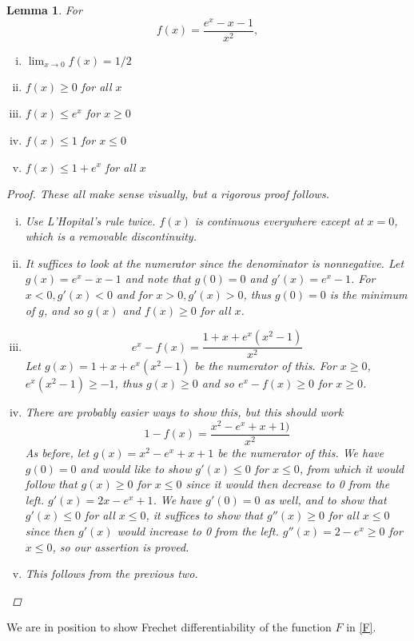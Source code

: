 \documentclass[12pt]{article}
\newtheorem{lemma}{Lemma}
\begin{document}
\begin{lemma}\label{expineq}
For
\[
f(x) = \frac{e^x - x - 1}{x^2},
\]

\begin{enumerate}[(i)]
	\item $\lim_{x \rightarrow 0} f(x) = 1/2$
	\item $f(x) \geq 0$ for all $x$
	\item $f(x) \leq e^x$ for $x \geq 0$
	\item $f(x) \leq 1$ for $x \leq 0$
	\item $f(x) \leq 1 + e^x$ for all $x$
\end{enumerate}
\begin{proof}
These all make sense visually, but a rigorous proof follows.
\begin{enumerate}[(i)]
	\item Use L'Hopital's rule twice. $f(x)$ is continuous everywhere except at $x = 0$, which is a removable discontinuity.
	\item It suffices to look at the numerator since the denominator is nonnegative. Let $g(x) = e^x - x - 1$ and note that $g(0) = 0$ and $g'(x) = e^x - 1$. For $x < 0, g'(x) < 0$ and for $x > 0, g'(x) > 0$, thus $g(0) = 0$ is the minimum of $g$, and so $g(x)$ and $f(x) \geq 0$ for all $x$.
	\item 
	\[
	e^x - f(x) = \frac{1 + x + e^x (x^2 - 1)}{x^2}
	\]
	Let $g(x) = 1 + x + e^x (x^2 - 1)$ be the numerator of this. For $x \geq 0$, $e^x (x^2 - 1) \geq -1$, thus $g(x) \geq 0$ and so $e^x - f(x) \geq 0$ for $x \geq 0$.
	\item There are probably easier ways to show this, but this should work
	\[
	1 - f(x) = \frac{x^2 - e^x + x + 1)}{x^2}
	\]
	As before, let $g(x) = x^2 - e^x + x + 1$ be the numerator of this. We have $g(0) = 0$ and would like to show $g'(x) \leq 0$ for $x \leq 0$, from which it would follow that $g(x) \geq 0$ for $x 
	\leq 0$ since it would then decrease to 0 from the left. $g'(x) = 2x - e^x + 1$. We have $g'(0) = 0$ as well, and to show that $g'(x) \leq 0$ for all $x \leq 0$, it suffices to show that $g''(x) \geq 0$ for all $x \leq 0$ since then $g'(x)$ would increase to 0 from the left. $g''(x) = 2 - e^x \geq 0$ for $x \leq 0$, so our assertion is proved.
	\item This follows from the previous two.
\end{enumerate}
\end{proof}
\end{lemma}

We are in position to show Frechet differentiability of the function $F$ in \eqref{F}.
\end{document}
